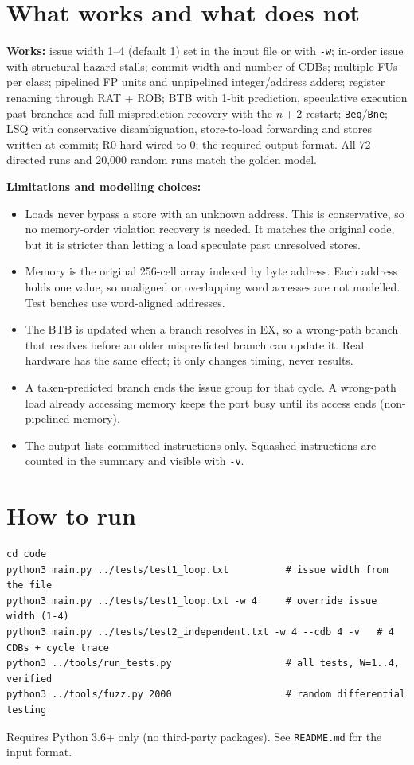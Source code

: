\documentclass[11pt]{article}
\begin{document}
\section{What works and what does not}
\textbf{Works:} issue width 1--4 (default 1) set in the input file or with \texttt{-w}; in-order
issue with structural-hazard stalls; commit width and number of CDBs; multiple FUs per class;
pipelined FP units and unpipelined integer/address adders; register renaming through RAT + ROB;
BTB with 1-bit prediction, speculative execution past branches and full misprediction recovery
with the $n{+}2$ restart; \texttt{Beq}/\texttt{Bne}; LSQ with conservative disambiguation,
store-to-load forwarding and stores written at commit; R0 hard-wired to 0; the required output
format. All 72 directed runs and 20{,}000 random runs match the golden model.

\textbf{Limitations and modelling choices:}
\begin{itemize}
  \item Loads never bypass a store with an unknown address. This is conservative, so no
        memory-order violation recovery is needed. It matches the original code, but it is
        stricter than letting a load speculate past unresolved stores.
  \item Memory is the original 256-cell array indexed by byte address. Each address holds one
        value, so unaligned or overlapping word accesses are not modelled. Test benches use
        word-aligned addresses.
  \item The BTB is updated when a branch resolves in EX, so a wrong-path branch that resolves
        before an older mispredicted branch can update it. Real hardware has the same effect;
        it only changes timing, never results.
  \item A taken-predicted branch ends the issue group for that cycle. A wrong-path load already
        accessing memory keeps the port busy until its access ends (non-pipelined memory).
  \item The output lists committed instructions only. Squashed instructions are counted in the
        summary and visible with \texttt{-v}.
\end{itemize}

\section{How to run}
\begin{lstlisting}
cd code
python3 main.py ../tests/test1_loop.txt          # issue width from the file
python3 main.py ../tests/test1_loop.txt -w 4     # override issue width (1-4)
python3 main.py ../tests/test2_independent.txt -w 4 --cdb 4 -v   # 4 CDBs + cycle trace
python3 ../tools/run_tests.py                    # all tests, W=1..4, verified
python3 ../tools/fuzz.py 2000                    # random differential testing
\end{lstlisting}
Requires Python 3.6+ only (no third-party packages). See \texttt{README.md} for the input format.
\end{document}
